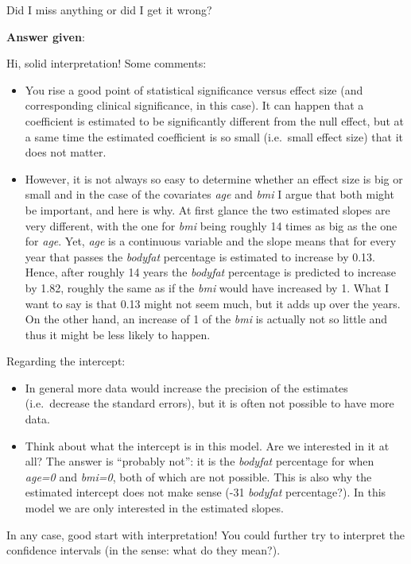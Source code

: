 \documentclass[
  letterpaper,
  8pt,
  a4paper]{book}
\providecommand{\tightlist}{%
  \setlength{\itemsep}{0pt}\setlength{\parskip}{0pt}}
\begin{document}
Did I miss anything or did I get it wrong?

\textbf{Answer given}:

Hi, solid interpretation! Some comments:

\begin{itemize}
\tightlist
\item
  You rise a good point of statistical significance versus effect size
  (and corresponding clinical significance, in this case). It can happen
  that a coefficient is estimated to be significantly different from the
  null effect, but at a same time the estimated coefficient is so small
  (i.e.~small effect size) that it does not matter.
\item
  However, it is not always so easy to determine whether an effect size
  is big or small and in the case of the covariates \emph{age} and
  \emph{bmi} I argue that both might be important, and here is why. At
  first glance the two estimated slopes are very different, with the one
  for \emph{bmi} being roughly 14 times as big as the one for
  \emph{age}. Yet, \emph{age} is a continuous variable and the slope
  means that for every year that passes the \emph{bodyfat} percentage is
  estimated to increase by 0.13. Hence, after roughly 14 years the
  \emph{bodyfat} percentage is predicted to increase by 1.82, roughly
  the same as if the \emph{bmi} would have increased by 1. What I want
  to say is that 0.13 might not seem much, but it adds up over the
  years. On the other hand, an increase of 1 of the \emph{bmi} is
  actually not so little and thus it might be less likely to happen.
\end{itemize}

Regarding the intercept:

\begin{itemize}
\tightlist
\item
  In general more data would increase the precision of the estimates
  (i.e.~decrease the standard errors), but it is often not possible to
  have more data.
\item
  Think about what the intercept is in this model. Are we interested in
  it at all? The answer is ``probably not'': it is the \emph{bodyfat}
  percentage for when \emph{age=0} and \emph{bmi=0}, both of which are
  not possible. This is also why the estimated intercept does not make
  sense (-31 \emph{bodyfat} percentage?). In this model we are only
  interested in the estimated slopes.
\end{itemize}

In any case, good start with interpretation! You could further try to
interpret the confidence intervals (in the sense: what do they mean?).
\end{document}
